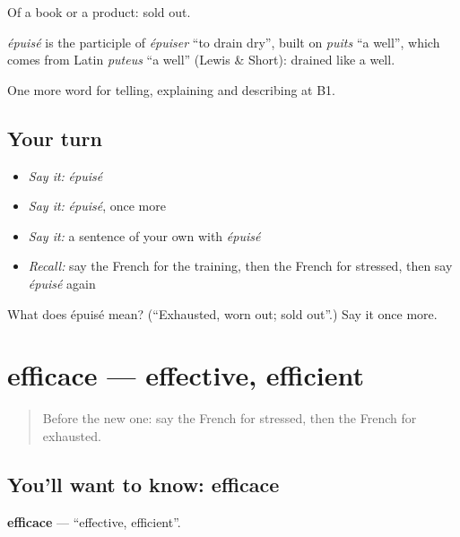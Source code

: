 Of a book or a product: sold out.

\begin{cousinweb}
\emph{épuisé} is the participle of \emph{épuiser} \textquotedblleft{}to drain dry\textquotedblright{}, built on \emph{puits} \textquotedblleft{}a well\textquotedblright{}, which comes from Latin \emph{puteus} \textquotedblleft{}a well\textquotedblright{} (Lewis \& Short): drained like a well.
\end{cousinweb}

\begin{grammarlens}[title={What you've built}]
One more word for telling, explaining and describing at B1.
\end{grammarlens}

\subsection*{Your turn}
\begin{itemize}
\raggedright
  \item \emph{Say it:} \emph{épuisé}
  \item \emph{Say it:} \emph{épuisé}, once more
  \item \emph{Say it:} a sentence of your own with \emph{épuisé}
  \item \emph{Recall:} say the French for the training, then the French for stressed, then say \emph{épuisé} again
\end{itemize}

\begin{tcolorbox}[breakable,colback=teal!4,colframe=teal!35!black,title={Before you move on}]
What does épuisé mean? (\textquotedblleft{}Exhausted, worn out; sold out\textquotedblright{}.) Say it once more.
\end{tcolorbox}
\section[efficace]{efficace — effective, efficient}

\label{lesson:FR-C361-efficace}



\begin{quote}
Before the new one: say the French for stressed, then the French for exhausted.
\end{quote}

\subsection*{You'll want to know: efficace}
\textbf{efficace} — \textquotedblleft{}effective, efficient\textquotedblright{}.

